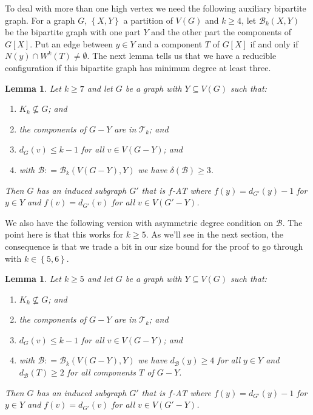 \documentclass[12pt]{article}
\theoremstyle{plain}
\newtheorem{lem}[thm]{Lemma}
\theoremstyle{definition}
\theoremstyle{remark}
\newcommand{\fancy}[1]{\mathcal{#1}}
\newcommand{\T}{\fancy{T}}
\newcommand{\B}{\fancy{B}}
\newcommand{\set}[1]{\left\{ #1 \right\}}
\newcommand{\DefinedAs}{\mathrel{\mathop:}=}
\begin{document}
To deal with more than one high vertex we need the following auxiliary bipartite graph.  For a graph $G$, $\set{X, Y}$ a partition of $V(G)$ and $k \ge 4$, let $\B_k(X, Y)$ be the bipartite graph with one part $Y$ and the other part the components of $G[X]$.  Put an edge between $y \in Y$ and a component $T$ of $G[X]$ if and only if $N(y) \cap W^k(T) \ne \emptyset$.   The next lemma tells us that we have a reducible configuration if this bipartite graph has minimum degree at least three.  

\begin{lem}
	\label{MultipleHighConfigurationEuler} Let $k\ge7$ and let $G$ be a graph with
	$Y\subseteq V(G)$ such that: 
	\begin{enumerate}
		\item $K_{k}\not\subseteq G$; and 
		\item the components of $G-Y$ are in $\T_{k}$; and 
		\item $d_{G}(v)\leq k-1$ for all $v\in V(G-Y)$; and 
		\item with $\B\DefinedAs\B_{k}(V(G-Y),Y)$ we have $\delta(\B)\ge3$. 
	\end{enumerate}
	\noindent Then $G$ has an induced subgraph $G'$ that is $f$-AT where $f(y)=d_{G'}(y)-1$
	for $y\in Y$ and $f(v)=d_{G'}(v)$ for all $v\in V(G'-Y)$.\end{lem}

We also have the following version with asymmetric degree condition on $\B$.  The point here is that this works for $k \ge 5$.  As we'll see in the next section, the consequence is that we trade a bit in our size bound for the proof to go through with $k \in \set{5,6}$.

\begin{lem}
	\label{MultipleHighConfigurationEulerLopsided} Let $k \ge 5$ and let $G$ be a graph with
	$Y\subseteq V(G)$ such that: 
	\begin{enumerate}
		\item $K_{k}\not\subseteq G$; and 
		\item the components of $G-Y$ are in $\T_{k}$; and 
		\item $d_{G}(v)\leq k-1$ for all $v\in V(G-Y)$; and 
		\item with $\B \DefinedAs \B_k(V(G-Y), Y)$ we have $d_{\B}(y) \ge 4$ for all $y \in Y$ and $d_{\B}(T) \ge 2$ for all components $T$ of $G-Y$.
	\end{enumerate}
	\noindent Then $G$ has an induced subgraph $G'$ that is $f$-AT where $f(y)=d_{G'}(y)-1$
	for $y\in Y$ and $f(v)=d_{G'}(v)$ for all $v\in V(G'-Y)$.\end{lem}





\end{document}
